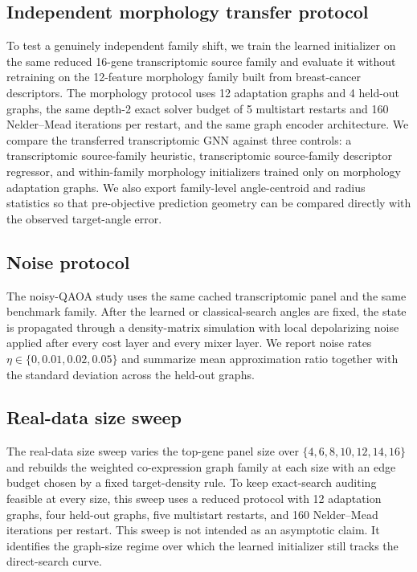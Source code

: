 \documentclass[
  reprint,
  twocolumn,
  aps,
  superscriptaddress,
  longbibliography,
  floatfix
]{revtex4-2}
\begin{document}
\subsection{Independent morphology transfer protocol}
To test a genuinely independent family shift, we train the learned initializer on the same reduced 16-gene transcriptomic source family and evaluate it without retraining on the 12-feature morphology family built from breast-cancer descriptors. The morphology protocol uses 12 adaptation graphs and 4 held-out graphs, the same depth-2 exact solver budget of 5 multistart restarts and 160 Nelder--Mead iterations per restart, and the same graph encoder architecture. We compare the transferred transcriptomic GNN against three controls: a transcriptomic source-family heuristic, transcriptomic source-family descriptor regressor, and within-family morphology initializers trained only on morphology adaptation graphs. We also export family-level angle-centroid and radius statistics so that pre-objective prediction geometry can be compared directly with the observed target-angle error.

\subsection{Noise protocol}
The noisy-QAOA study uses the same cached transcriptomic panel and the same benchmark family. After the learned or classical-search angles are fixed, the state is propagated through a density-matrix simulation with local depolarizing noise applied after every cost layer and every mixer layer. We report noise rates $\eta \in \{0,0.01,0.02,0.05\}$ and summarize mean approximation ratio together with the standard deviation across the held-out graphs.

\subsection{Real-data size sweep}
The real-data size sweep varies the top-gene panel size over $\{4,6,8,10,12,14,16\}$ and rebuilds the weighted co-expression graph family at each size with an edge budget chosen by a fixed target-density rule. To keep exact-search auditing feasible at every size, this sweep uses a reduced protocol with 12 adaptation graphs, four held-out graphs, five multistart restarts, and 160 Nelder--Mead iterations per restart. This sweep is not intended as an asymptotic claim. It identifies the graph-size regime over which the learned initializer still tracks the direct-search curve.
\end{document}

